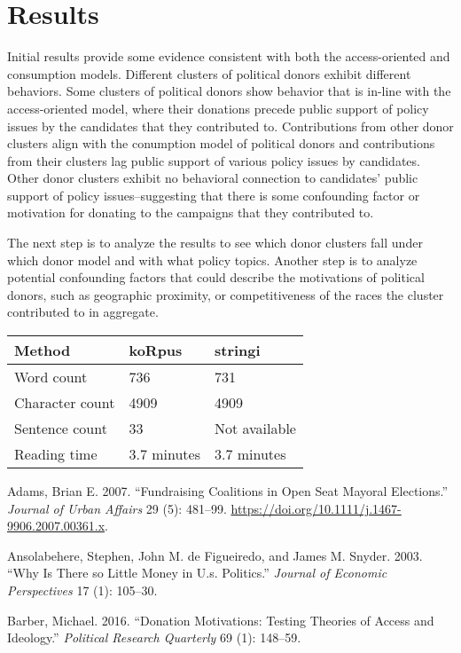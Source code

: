\documentclass[12pt,]{article}
\begin{document}
\hypertarget{results}{%
\section{Results}\label{results}}

Initial results provide some evidence consistent with both the
access-oriented and consumption models. Different clusters of political
donors exhibit different behaviors. Some clusters of political donors
show behavior that is in-line with the access-oriented model, where
their donations precede public support of policy issues by the
candidates that they contributed to. Contributions from other donor
clusters align with the conumption model of political donors and
contributions from their clusters lag public support of various policy
issues by candidates. Other donor clusters exhibit no behavioral
connection to candidates' public support of policy issues--suggesting
that there is some confounding factor or motivation for donating to the
campaigns that they contributed to.

The next step is to analyze the results to see which donor clusters fall
under which donor model and with what policy topics. Another step is to
analyze potential confounding factors that could describe the
motivations of political donors, such as geographic proximity, or
competitiveness of the races the cluster contributed to in aggregate.

\begin{longtable}[]{@{}lll@{}}
\toprule
Method & koRpus & stringi\tabularnewline
\midrule
\endhead
Word count & 736 & 731\tabularnewline
Character count & 4909 & 4909\tabularnewline
Sentence count & 33 & Not available\tabularnewline
Reading time & 3.7 minutes & 3.7 minutes\tabularnewline
\bottomrule
\end{longtable}

\hypertarget{refs}{}
\leavevmode\hypertarget{ref-adams2016}{}%
Adams, Brian E. 2007. ``Fundraising Coalitions in Open Seat Mayoral
Elections.'' \emph{Journal of Urban Affairs} 29 (5): 481--99.
\url{https://doi.org/10.1111/j.1467-9906.2007.00361.x}.

\leavevmode\hypertarget{ref-ansolabehere2003}{}%
Ansolabehere, Stephen, John M. de Figueiredo, and James M. Snyder. 2003.
``Why Is There so Little Money in U.s. Politics.'' \emph{Journal of
Economic Perspectives} 17 (1): 105--30.

\leavevmode\hypertarget{ref-barber2016}{}%
Barber, Michael. 2016. ``Donation Motivations: Testing Theories of
Access and Ideology.'' \emph{Political Research Quarterly} 69 (1):
148--59.
\end{document}
